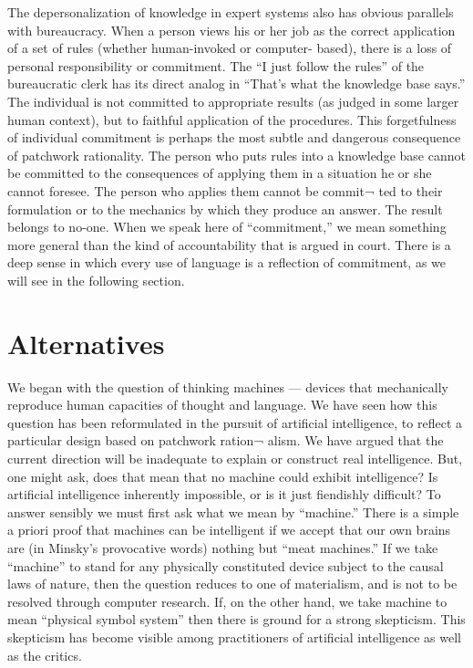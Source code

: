 \documentclass[12pt]{article}
\begin{document}
The depersonalization of knowledge in expert systems also has obvious parallels with bureaucracy. When a person views his or her job as the correct application of a set of rules (whether human-invoked or computer- based), there is a loss of personal responsibility or commitment. The ``I just follow the rules'' of the bureaucratic clerk has its direct analog in ``That's what the knowledge base says.'' The individual is not committed to appropriate results (as judged in some larger human context), but to faithful application of the procedures. This forgetfulness of individual commitment is perhaps the most subtle and dangerous consequence of patchwork rationality. The person who puts rules into a knowledge base cannot be committed to the consequences of applying them in a situation he or she cannot foresee. The person who applies them cannot be commit¬ ted to their formulation or to the mechanics by which they produce an answer. The result belongs to no-one. When we speak here of ``commitment,'' we mean something more general than the kind of accountability that is argued in court. There is a deep sense in which every use of language is a reflection of commitment, as we will see in the following section.

\section{Alternatives}

We began with the question of thinking machines --- devices that mechanically reproduce human capacities of thought and language. We have seen how this question has been reformulated in the pursuit of artificial intelligence, to reflect a particular design based on patchwork ration¬ alism. We have argued that the current direction will be inadequate to explain or construct real intelligence.
But, one might ask, does that mean that no machine could exhibit intelligence? Is artificial intelligence inherently impossible, or is it just fiendishly difficult? To answer sensibly we must first ask what we mean by ``machine.'' There is a simple a priori proof that machines can be intelligent if we accept that our own brains are (in Minsky's provocative words) nothing but ``meat machines.'' If we take ``machine'' to stand for any physically constituted device subject to the causal laws of nature, then the question reduces to one of materialism, and is not to be resolved through computer research. If, on the other hand, we take machine to mean ``physical symbol system'' then there is ground for a strong skepticism. This skepticism has become visible among practitioners of artificial intelligence as well as the critics.
\end{document}
